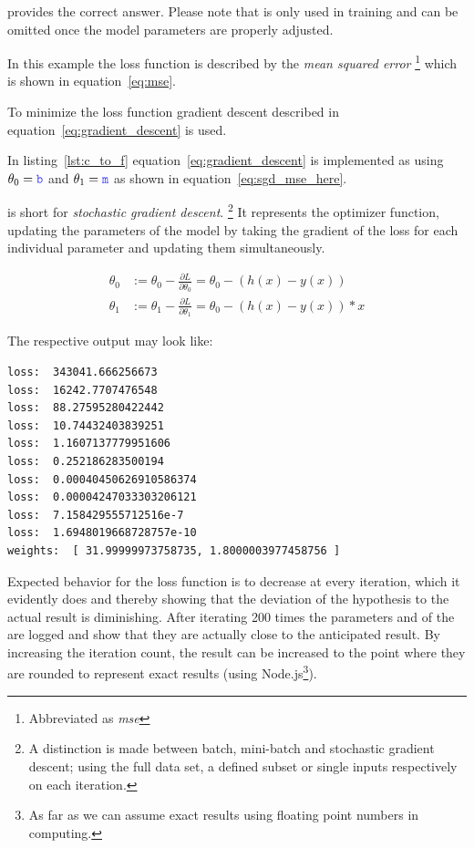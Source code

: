  provides the correct answer.
Please note that  is only used in training and can be omitted once the model parameters are properly adjusted.

In this example the loss function is described by the \textit{mean squared error } \footnote{ Abbreviated as \textit{mse} } which is shown in equation~\eqref{eq:mse}.

To minimize the loss function gradient descent described in equation~\eqref{eq:gradient_descent} is used.

In listing~\ref{lst:c_to_f} equation~\eqref{eq:gradient_descent} is implemented as  using $\theta_0 = \code{b}$ and $\theta_1= \code{m}$ as shown in equation~\eqref{eq:sgd_mse_here}.

 is short for \textit{stochastic gradient descent}.
\footnote{A distinction is made between batch, mini-batch and stochastic
    gradient descent;
    using the full data set, a defined subset or single inputs respectively on
    each iteration.}
It represents the optimizer function, updating the parameters of the model by taking the gradient of the loss for each individual parameter and updating them simultaneously.

\begin{equation} \label{eq:sgd_mse_here}
    \begin{split}
        \theta_{0} & := \theta_{0} - \frac{\partial L}{\partial \theta_{0}} =
        \theta_{0} - (h(x) - y(x))  \\
        \theta_{1} & := \theta_{1} - \frac{\partial L}{\partial \theta_{1}} =
        \theta_{0} - (h(x) - y(x)) * x
    \end{split}
\end{equation}

The respective output may look like:
\begin{lstlisting}
loss:  343041.666256673
loss:  16242.7707476548
loss:  88.27595280422442
loss:  10.74432403839251
loss:  1.1607137779951606
loss:  0.252186283500194
loss:  0.00040450626910586374
loss:  0.00004247033303206121
loss:  7.158429555712516e-7
loss:  1.6948019668728757e-10
weights:  [ 31.99999973758735, 1.8000003977458756 ]
\end{lstlisting} 

Expected behavior for the loss function is to decrease at every iteration, which it evidently does and thereby showing that the deviation of the hypothesis to the actual result is diminishing.
After iterating 200 times the parameters  and  of the  are logged and show that they are actually close to the anticipated result.
By increasing the iteration count, the result can be increased to the point where they are rounded to represent exact results (using Node.js\footnote{ As far as we can assume exact results using floating point numbers in computing.}).

